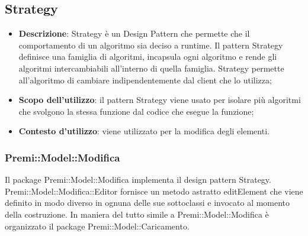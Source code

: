 {	\subsection{Strategy}{
		\begin{itemize}
			\item \textbf{Descrizione}: Strategy è un Design Pattern che permette che il comportamento di un algoritmo sia deciso a runtime.
			Il pattern Strategy definisce una famiglia di algoritmi, incapsula ogni algoritmo e rende gli algoritmi intercambiabili all'interno di quella famiglia.
			Strategy permette all'algoritmo di cambiare indipendentemente dal client che lo utilizza;\\
			\item \textbf{Scopo dell’utilizzo}: il pattern Strategy viene usato per isolare più algoritmi che svolgono la stessa funzione dal codice che esegue la funzione;
			\item \textbf{Contesto d’utilizzo}: viene utilizzato per la modifica degli elementi.
		\end{itemize}
	\subsubsection{Premi::Model::Modifica}{
			Il package Premi::Model::Modifica implementa il design pattern Strategy.
			Premi::Model::Modifica::Editor fornisce un metodo astratto editElement che viene definito in modo diverso in ognuna delle sue sottoclassi e invocato al momento della costruzione.
			}
			In maniera del tutto simile a Premi::Model::Modifica è organizzato il package Premi::Model::Caricamento.
		
	}
}